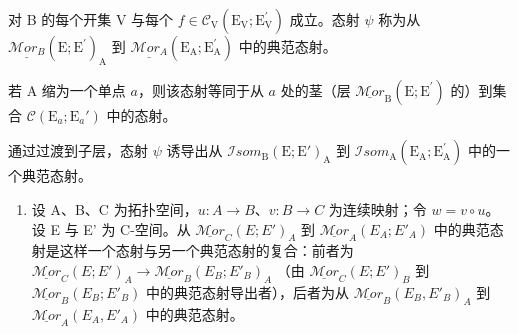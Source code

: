 对 B 的每个开集 V 与每个 \(f \in \mathcal{C}_{\mathrm{V}}(\mathrm{E}_{\mathrm{V}}; \mathrm{E}_{\mathrm{V}}^{\prime})\) 成立。态射 \(\psi\) 称为从 \(\underline{\mathcal{M}or_{B}}(\mathrm{E}; \mathrm{E}^{\prime})_{\mathrm{A}}\) 到 \(\underline{\mathcal{M}or_{A}}(\mathrm{E}_{\mathrm{A}}; \mathrm{E}_{\mathrm{A}}^{\prime})\) 中的典范态射。

若 A 缩为一个单点 \(a\)，则该态射等同于从 \(a\) 处的茎（层 \(\underline{\mathcal{M}or}_{\mathrm{B}}(\mathrm{E};\mathrm{E}^{\prime})\) 的）到集合 \(\mathcal{C}(\mathrm{E}_a;\mathrm{E}_a')\) 中的态射。

通过过渡到子层，态射 \(\psi\) 诱导出从 \(\mathcal{I}som_{\mathrm{B}}(\mathrm{E};\mathrm{E}')_{\mathrm{A}}\) 到 \(\mathcal{I}som_{\mathrm{A}}(\mathrm{E}_{\mathrm{A}};\mathrm{E}_{\mathrm{A}}^{\prime})\) 中的一个典范态射。

\begin{enumerate}
\def\labelenumi{\arabic{enumi})}
\setcounter{enumi}{1}
\tightlist
\item
  设 A、B、C 为拓扑空间，\(u\colon A\to B\)、\(v\colon B\to C\) 为连续映射；令 \(w=v\circ u\)。设 E 与 E' 为 C-空间。从 \(\underline{\mathcal{M}or}_{C}(E;E')_{A}\) 到 \(\underline{\mathcal{M}or}_{A}(E_{A};E'_{A})\) 中的典范态射是这样一个态射与另一个典范态射的复合：前者为 \(\underline{\mathcal{M}or}_{C}(E;E')_{A}\to\underline{\mathcal{M}or}_{B}(E_{B};E'_{B})_{A}\) （由 \(\underline{\mathcal{M}or}_{C}(E;E')_{B}\) 到 \(\underline{\mathcal{M}or}_{B}(E_{B};E'_{B})\) 中的典范态射导出者），后者为从 \(\underline{\mathcal{M}or}_{B}(E_{B},E'_{B})_{A}\) 到 \(\underline{\mathcal{M}or}_{A}(E_{A},E'_{A})\) 中的典范态射。
\end{enumerate}
